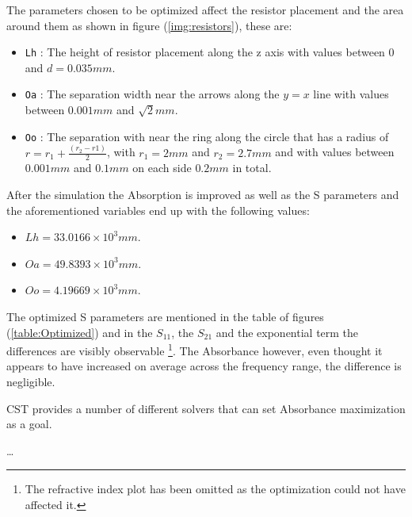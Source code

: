         The parameters chosen to be optimized affect the resistor placement and the area around 
        them as shown in figure (\ref{img:resistors}), these are:
        \begin{itemize}
            \item \texttt{Lh} : The height of resistor placement along the \textsf{z} axis
                with values between 0 and $d=0.035mm$.
            \item \texttt{Oa} : The separation width near the arrows along the $y=x$ line
                with values between $0.001mm$ and $\sqrt{2}mm$.
            \item \texttt{Oo} : The separation with near the ring along the circle that has a 
                radius of $r=r_1+\frac{(r_2-r1)}{2}$, with $r_1=2mm$ and $r_2=2.7mm$ and with 
                values between $0.001mm$ and $0.1mm$ on each side $0.2mm$ in total.
        \end{itemize}
        
        After the simulation the Absorption is improved as well as the S parameters and
        the aforementioned variables end up with the following values:
        \begin{itemize}
            \item $ Lh = 33.0166 \times 10^3 mm $.
            \item $ Oa = 49.8393 \times 10^3 mm $.
            \item $ Oo = 4.19669 \times 10^3 mm $.
        \end{itemize}

        The optimized S parameters are mentioned in the table of figures (\ref{table:Optimized})
        and in the $S_{11}$, the $S_{21}$ and the exponential term the differences are visibly
        observable \footnote{The refractive index plot has been omitted as the optimization could not 
        have affected it.}. The Absorbance however, even thought it appears to have increased on 
        average across the frequency range, the difference is negligible.

        CST provides a number of different solvers that can set Absorbance maximization as a goal.

        \dots


